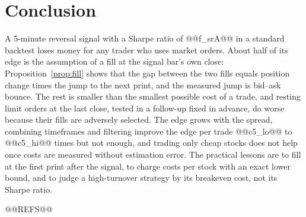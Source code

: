 \documentclass[11pt,a4paper]{article}
\begin{document}
\section{Conclusion}

A 5-minute reversal signal with a Sharpe ratio of @@f_srA@@ in a standard backtest loses money for any
trader who uses market orders. About half of its edge is the assumption of a fill at the signal bar's own
close: Proposition~\ref{prop:fill} shows that the gap between the two fills equals position change times the
jump to the next print, and the measured jump is bid--ask bounce. The rest is smaller than the smallest
possible cost of a trade, and resting limit orders at the last close, tested in a follow-up fixed in advance,
do worse because their fills are adversely selected. The edge grows with the spread, combining timeframes and
filtering improve the edge per trade @@c5_lo@@ to @@c5_hi@@ times but not enough, and trading only cheap stocks
does not help once costs are measured without estimation error. The practical lessons are to fill at the
first print after the signal, to charge costs per stock with an exact lower bound, and to judge a
high-turnover strategy by its breakeven cost, not its Sharpe ratio.

@@REFS@@
\end{document}
